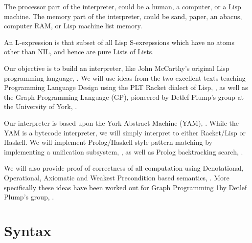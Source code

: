 The processor part of the interpreter, could be a human, a computer, or a Lisp
machine. The memory part of the interpreter, could be sand, paper, an abacus,
computer RAM, or Lisp machine list memory.

An L-expression is that subset of all Lisp S-exrepssions which have no atoms
other than NIL, and hence are pure Lists of Lists.

Our objective is to build an interpreter, like John McCarthy's original Lisp
programming language, \cite{mcCarthy1960lisp,
mcCarthyAbrahamsEdwardsHartLevin1965lispManual}. We will use ideas from the two
excellent texts teaching Programming Language Design using the PLT Racket
dialect of Lisp,
\cite{krishnamurthi2007programmingLanguagesApplicationInterpretation,
krishnamurthi2012programmingLanguagesApplicationInterpretation,
friedmanWand2008essentialsProgrammingLanguages, racket2016racket}, as well as
the Graph Programming Language (GP), pioneered by Detlef Plump's group at the
University of York, \cite{steinert2007graphProgramming,
manningPlump2008yorkMachine, plump2009graphProgramming,
plumpSteinert2010semanticsGraphProgramming, plump2012graphProgramming}.

Our interpreter is based upon the York Abstract Machine (YAM),
\cite{manningPlump2008yorkMachine}. While the YAM is a bytecode interpreter, we
will simply interpret to either Racket/Lisp or Haskell. We will implement
Prolog/Haskell style pattern matching by implementing a unification subsystem,
\cite[section
30.5.1]{krishnamurthi2007programmingLanguagesApplicationInterpretation}, as well
as Prolog backtracking search,
\cite[34.1.1]{krishnamurthi2007programmingLanguagesApplicationInterpretation}.

We will also provide proof of correctness of all computation using Denotational,
Operational, Axiomatic and Weakest Precondition based semantics,
\cite{gunter1992semainticProgrammingLanguages,
winskel1993formalSemanticsProgrammingLanguages, gries1981scienceProgramming,
scott1970theoryComputation, plotkin1981structuralOperationalSemantics,
hoare1969axiomaticSemantics, dijkstra1975guardedCommandsFormalDerivation}. More
specifically these ideas have been worked out for Graph Programming 1by Detlef
Plump's group, \cite{steinert2007graphProgramming,
plumpSteinert2010semanticsGraphProgramming, poskittPlump2010hoareLogic,
poskittPlump2010hoareCalculus}.

\section{Syntax}


